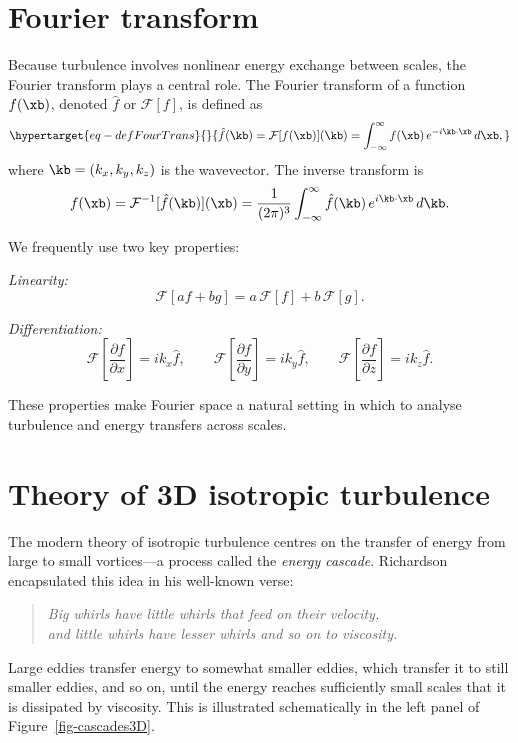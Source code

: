 \documentclass[
  letterpaper,
  twocolumn,
  landscape]{report}
\begin{document}
\hypertarget{fourier-transform}{%
\section{Fourier transform}\label{fourier-transform}}

Because turbulence involves nonlinear energy exchange between scales,
the Fourier transform plays a central role. The Fourier transform of a
function \(f(\xb)\), denoted \(\hat{f}\) or \(\mathcal{F}[f]\), is
defined as \begin{equation}\protect\hypertarget{eq-defFourTrans}{}{
\hat{f}(\kb) = \mathcal{F}[f(\xb)](\kb)
= \int_{-\infty}^{\infty} f(\xb)\, e^{-i\kb\cdot\xb}\, d\xb,
}\label{eq-defFourTrans}\end{equation} where \(\kb = (k_x,k_y,k_z)\) is
the wavevector. The inverse transform is \[
f(\xb) = \mathcal{F}^{-1}[\hat{f}(\kb)](\xb)
= \frac{1}{(2\pi)^3}\int_{-\infty}^{\infty} \hat{f}(\kb)\, e^{i\kb\cdot\xb}\, d\kb.
\]

We frequently use two key properties:

\emph{Linearity:} \[
\mathcal{F}[a f + b g] = a\,\mathcal{F}[f] + b\,\mathcal{F}[g].
\]

\emph{Differentiation:} \[
\mathcal{F}\!\left[\frac{\partial f}{\partial x}\right] = i k_x \hat{f}, \qquad
\mathcal{F}\!\left[\frac{\partial f}{\partial y}\right] = i k_y \hat{f}, \qquad
\mathcal{F}\!\left[\frac{\partial f}{\partial z}\right] = i k_z \hat{f}.
\]

These properties make Fourier space a natural setting in which to
analyse turbulence and energy transfers across scales.

\hypertarget{sec-3Dturb}{%
\section{Theory of 3D isotropic turbulence}\label{sec-3Dturb}}

The modern theory of isotropic turbulence centres on the transfer of
energy from large to small vortices---a process called the \emph{energy
cascade}. Richardson encapsulated this idea in his well-known verse:

\begin{quote}
\emph{Big whirls have little whirls that feed on their velocity,}\\
\emph{and little whirls have lesser whirls and so on to viscosity.}
\end{quote}

Large eddies transfer energy to somewhat smaller eddies, which transfer
it to still smaller eddies, and so on, until the energy reaches
sufficiently small scales that it is dissipated by viscosity. This is
illustrated schematically in the left panel of
Figure~\ref{fig-cascades3D}.
\end{document}
